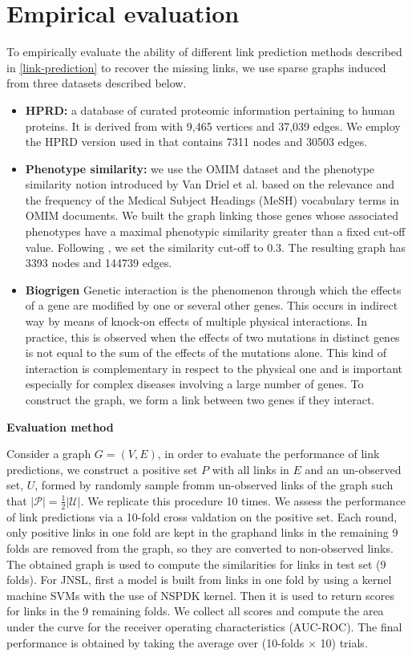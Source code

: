 \documentclass{article}
\begin{document}
\section{Empirical evaluation}
\label{evaluation}
To empirically evaluate the ability of different link prediction methods described in \ref{link-prediction} to recover the missing links, we use sparse graphs induced from three datasets described below.
\begin{itemize}
\item \textbf{HPRD:} a database of curated proteomic information pertaining to human proteins. It is derived from \cite{hprd} with 9,465 vertices and 37,039 edges. We employ the HPRD version used in \cite{cdnk} that contains 7311 nodes and 30503 edges.
\item \textbf{Phenotype similarity:} we use the OMIM \cite{omim} dataset and the phenotype similarity notion introduced by Van Driel et al. \cite{hprd} based on the relevance and the frequency of the Medical Subject Headings (MeSH) vocabulary terms in OMIM documents. We built the graph linking those genes whose associated phenotypes have a maximal phenotypic similarity greater than a fixed cut-off value. Following \cite{hprd}, we set the similarity cut-off to $0.3$. The resulting graph has 3393 nodes and 144739 edges.
\item \textbf{Biogrigen} Genetic interaction is the phenomenon through which the effects of a gene are modified by one or several other genes. This occurs in indirect way by means of knock-on effects of multiple physical interactions. In practice, this is observed when the effects of two mutations in distinct genes is not equal to the sum of the effects of the mutations alone. This kind of interaction is complementary in respect to the physical one and is important especially for complex diseases involving a large number of genes. To construct the graph, we form a link between two genes if they interact.
\end{itemize}

\textbf{Evaluation method}

Consider a graph $G = (V, E)$, in order to evaluate the performance of link predictions, we construct a positive set $P$ with all links in $E$ and an un-observed set, $U$, formed by randomly sample fromm un-observed links of the graph such that $\vert \mathcal{P} \vert = \frac{1}{2} \vert \mathcal{U} \vert$. We replicate this procedure 10 times. We assess the performance of link predictions via a 10-fold cross valdation on the positive set. Each round, only positive links in one fold are kept in the graphand links in the remaining 9 folds are removed from the graph, so they are converted to non-observed links. The obtained graph is used to compute the similarities for links in test set (9 folds). For JNSL, first a model is built from links in one fold by using a kernel machine SVMs with the use of NSPDK kernel. Then it is used to return scores for links in the 9 remaining folds. We collect all scores and compute the area under the curve for the receiver operating characteristics (AUC-ROC). The final performance is obtained by taking the average over (10-folds $\times$ 10) trials.
\end{document}
